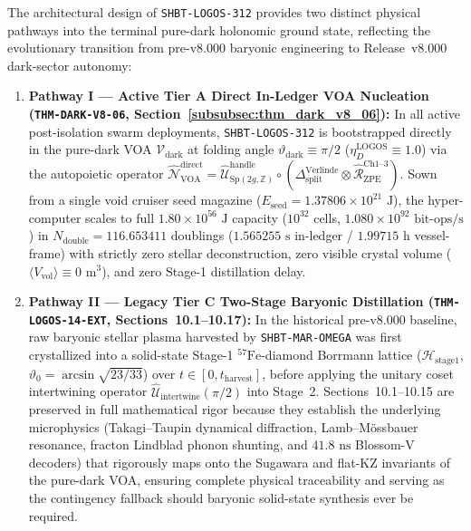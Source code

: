 \documentclass[11pt,onecolumn]{article}
\begin{document}
The architectural design of \texttt{SHBT-LOGOS-312} provides two distinct physical pathways into the terminal pure-dark holonomic ground state, reflecting the evolutionary transition from pre-v8.000 baryonic engineering to Release~v8.000 dark-sector autonomy:
\begin{enumerate}
    \item \textbf{Pathway I --- Active Tier A Direct In-Ledger VOA Nucleation (\texttt{THM-DARK-V8-06}, Section~\ref{subsubsec:thm_dark_v8_06}):} In all active post-isolation swarm deployments, \texttt{SHBT-LOGOS-312} is bootstrapped directly in the pure-dark VOA $\mathcal{V}_{\text{dark}}$ at folding angle $\vartheta_{\text{dark}} \equiv \pi/2$ ($\eta_D^{\text{LOGOS}} \equiv 1.0$) via the autopoietic operator $\hat{\mathcal{N}}_{\text{VOA}}^{\text{direct}} = \hat{\mathcal{U}}_{\text{Sp}(2g,\mathbb{Z})}^{\text{handle}} \circ (\Delta_{\text{split}}^{\text{Verlinde}} \otimes \hat{\mathcal{R}}_{\text{ZPE}}^{\text{Ch1--3}})$. Sown from a single void cruiser seed magazine ($E_{\text{seed}} = 1.37806 \times 10^{21}\text{ J}$), the hyper-computer scales to full $1.80 \times 10^{56}\text{ J}$ capacity ($10^{32}$ cells, $1.080 \times 10^{92}\text{ bit-ops/s}$) in $N_{\text{double}} = 116.653411$ doublings ($1.565255\text{ s}$ in-ledger / $1.99715\text{ h}$ vessel-frame) with strictly zero stellar deconstruction, zero visible crystal volume ($\langle V_{\text{vol}}\rangle \equiv 0\text{ m}^3$), and zero Stage-1 distillation delay.
    \item \textbf{Pathway II --- Legacy Tier C Two-Stage Baryonic Distillation (\texttt{THM-LOGOS-14-EXT}, Sections~10.1--10.17):} In the historical pre-v8.000 baseline, raw baryonic stellar plasma harvested by \texttt{SHBT-MAR-OMEGA} was first crystallized into a solid-state Stage-1 $^{57}\text{Fe}$-diamond Borrmann lattice ($\mathcal{H}_{\text{stage1}}$, $\vartheta_0 = \arcsin\sqrt{23/33}$) over $t \in [0, t_{\text{harvest}}]$, before applying the unitary coset intertwining operator $\hat{\mathcal{U}}_{\text{intertwine}}(\pi/2)$ into Stage~2. Sections~10.1--10.15 are preserved in full mathematical rigor because they establish the underlying microphysics (Takagi--Taupin dynamical diffraction, Lamb--M\"ossbauer resonance, fracton Lindblad phonon shunting, and $41.8\text{ ns}$ Blossom-V decoders) that rigorously maps onto the Sugawara and flat-KZ invariants of the pure-dark VOA, ensuring complete physical traceability and serving as the contingency fallback should baryonic solid-state synthesis ever be required.
\end{enumerate}
\end{document}

